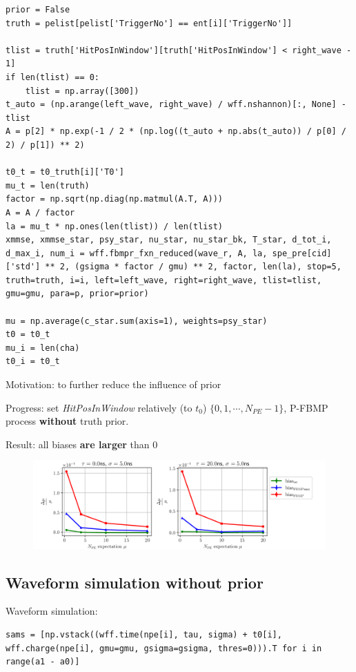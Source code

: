 \documentclass[notitlepage]{article}
\begin{document}
\begin{lstlisting}
prior = False
truth = pelist[pelist['TriggerNo'] == ent[i]['TriggerNo']]

tlist = truth['HitPosInWindow'][truth['HitPosInWindow'] < right_wave - 1]
if len(tlist) == 0:
    tlist = np.array([300])
t_auto = (np.arange(left_wave, right_wave) / wff.nshannon)[:, None] - tlist
A = p[2] * np.exp(-1 / 2 * (np.log((t_auto + np.abs(t_auto)) / p[0] / 2) / p[1]) ** 2)

t0_t = t0_truth[i]['T0']
mu_t = len(truth)
factor = np.sqrt(np.diag(np.matmul(A.T, A)))
A = A / factor
la = mu_t * np.ones(len(tlist)) / len(tlist)
xmmse, xmmse_star, psy_star, nu_star, nu_star_bk, T_star, d_tot_i, d_max_i, num_i = wff.fbmpr_fxn_reduced(wave_r, A, la, spe_pre[cid]['std'] ** 2, (gsigma * factor / gmu) ** 2, factor, len(la), stop=5, truth=truth, i=i, left=left_wave, right=right_wave, tlist=tlist, gmu=gmu, para=p, prior=prior)

mu = np.average(c_star.sum(axis=1), weights=psy_star)
t0 = t0_t
mu_i = len(cha)
t0_i = t0_t
\end{lstlisting}

Motivation: to further reduce the influence of prior

Progress: set \textit{HitPosInWindow} relatively (to $t_0$) $\{0,1,\cdots,N_{PE}-1\}$, P-FBMP process \textbf{without} truth prior. 

Result: all biases \textbf{are larger} than 0

\begin{figure}[H]
    \centering
    \includegraphics[width=\textwidth]{vs-biasmu-fixtlistnoprior.png}
\end{figure}

\subsection{Waveform simulation \textbf{without} prior}

Waveform simulation:

\begin{lstlisting}
sams = [np.vstack((wff.time(npe[i], tau, sigma) + t0[i], wff.charge(npe[i], gmu=gmu, gsigma=gsigma, thres=0))).T for i in range(a1 - a0)]
\end{lstlisting}
\end{document}
